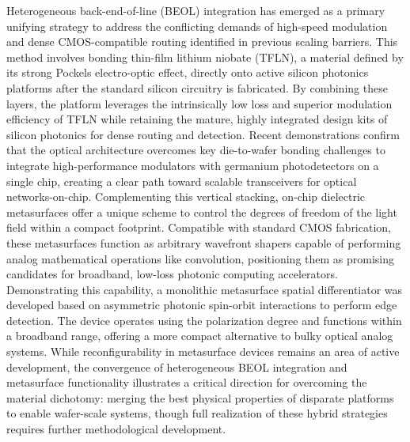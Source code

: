 Heterogeneous back-end-of-line (BEOL) integration has emerged as a primary unifying strategy to address the conflicting demands of high-speed modulation and dense CMOS-compatible routing identified in previous scaling barriers. This method involves bonding thin-film lithium niobate (TFLN), a material defined by its strong Pockels electro-optic effect, directly onto active silicon photonics platforms after the standard silicon circuitry is fabricated. \citep{s2_9b444e84d20ae6e3d62d2d4df30268b5a53baad2_40af2cc9} By combining these layers, the platform leverages the intrinsically low loss and superior modulation efficiency of TFLN while retaining the mature, highly integrated design kits of silicon photonics for dense routing and detection. Recent demonstrations confirm that the optical architecture overcomes key die-to-wafer bonding challenges to integrate high-performance modulators with germanium photodetectors on a single chip, creating a clear path toward scalable transceivers for optical networks-on-chip. Complementing this vertical stacking, on-chip dielectric metasurfaces offer a unique scheme to control the degrees of freedom of the light field within a compact footprint. Compatible with standard CMOS fabrication, these metasurfaces function as arbitrary wavefront shapers capable of performing analog mathematical operations like convolution, positioning them as promising candidates for broadband, low-loss photonic computing accelerators. Demonstrating this capability, a monolithic metasurface spatial differentiator was developed based on asymmetric photonic spin-orbit interactions to perform edge detection. The device operates using the polarization degree and functions within a broadband range, offering a more compact alternative to bulky optical analog systems. \citep{doi_10_1515_nanoph_2020_0366_58f1aa1d} While reconfigurability in metasurface devices remains an area of active development, the convergence of heterogeneous BEOL integration and metasurface functionality illustrates a critical direction for overcoming the material dichotomy: merging the best physical properties of disparate platforms to enable wafer-scale systems, though full realization of these hybrid strategies requires further methodological development. \citep{s2_9b444e84d20ae6e3d62d2d4df30268b5a53baad2_40af2cc9} \citep{doi_10_1515_nanoph_2022_0294_1bd118d5}


